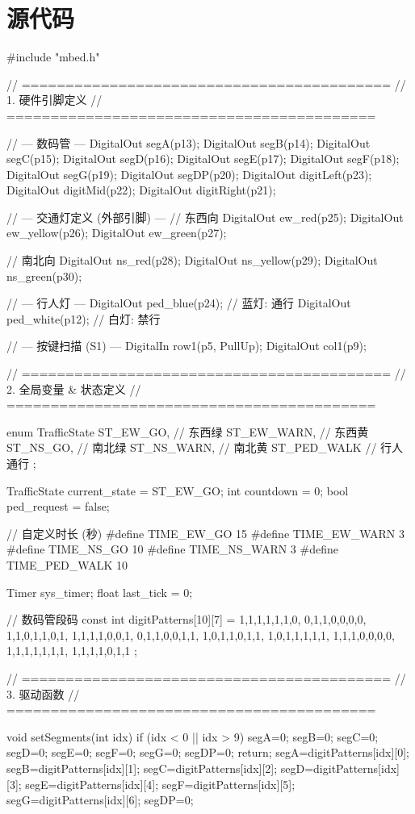 
\chapter{源代码}
\begin{cpp}
	#include "mbed.h"

// ==========================================
// 1. 硬件引脚定义
// ==========================================

// --- 数码管 ---
DigitalOut segA(p13); DigitalOut segB(p14); DigitalOut segC(p15);
DigitalOut segD(p16); DigitalOut segE(p17); DigitalOut segF(p18);
DigitalOut segG(p19); DigitalOut segDP(p20);
DigitalOut digitLeft(p23); DigitalOut digitMid(p22); DigitalOut digitRight(p21);

// --- 交通灯定义 (外部引脚) ---
// 东西向
DigitalOut ew_red(p25);
DigitalOut ew_yellow(p26);
DigitalOut ew_green(p27);

// 南北向
DigitalOut ns_red(p28);
DigitalOut ns_yellow(p29);
DigitalOut ns_green(p30);

// --- 行人灯 ---
DigitalOut ped_blue(p24);  // 蓝灯: 通行
DigitalOut ped_white(p12); // 白灯: 禁行

// --- 按键扫描 (S1) ---
DigitalIn row1(p5, PullUp); 
DigitalOut col1(p9); 

// ==========================================
// 2. 全局变量 & 状态定义
// ==========================================

enum TrafficState {
    ST_EW_GO,    // 东西绿
    ST_EW_WARN,  // 东西黄
    ST_NS_GO,    // 南北绿
    ST_NS_WARN,  // 南北黄
    ST_PED_WALK  // 行人通行
};

TrafficState current_state = ST_EW_GO;
int countdown = 0;        
bool ped_request = false; 

// 自定义时长 (秒)
#define TIME_EW_GO    15 
#define TIME_EW_WARN  3   
#define TIME_NS_GO    10 
#define TIME_NS_WARN  3   
#define TIME_PED_WALK 10  

Timer sys_timer;
float last_tick = 0;

// 数码管段码
const int digitPatterns[10][7] = {
    {1,1,1,1,1,1,0}, {0,1,1,0,0,0,0}, {1,1,0,1,1,0,1}, {1,1,1,1,0,0,1},
    {0,1,1,0,0,1,1}, {1,0,1,1,0,1,1}, {1,0,1,1,1,1,1}, {1,1,1,0,0,0,0},
    {1,1,1,1,1,1,1}, {1,1,1,1,0,1,1}
};

// ==========================================
// 3. 驱动函数
// ==========================================

void setSegments(int idx) {
    if (idx < 0 || idx > 9) { 
        segA=0; segB=0; segC=0; segD=0; segE=0; segF=0; segG=0; segDP=0; return;
    }
    segA=digitPatterns[idx][0]; segB=digitPatterns[idx][1]; segC=digitPatterns[idx][2];
    segD=digitPatterns[idx][3]; segE=digitPatterns[idx][4]; segF=digitPatterns[idx][5];
    segG=digitPatterns[idx][6]; segDP=0;
}


\end{cpp}
